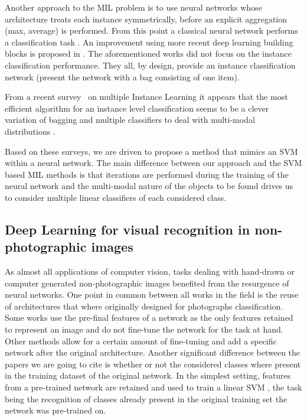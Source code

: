 \documentclass[preprint]{elsarticle}
\begin{document}
 Another approach to the MIL problem is to use neural networks whose architecture treats each instance symmetrically, before an explicit aggregation (max, average) is performed. From this point a classical neural network performs a classification task  \citep{ramon_multi_2000,zhou_neural_2002}. An improvement  using more recent deep learning building blocks is proposed in \citep{wang_revisiting_2018}.  The aforementioned works did not focus on the instance classification performance. They all, by design, provide an instance classification network (present the network with a bag consisting of one item). 


From a recent survey~\citep{carbonneau_multiple_2016} on multiple Instance Learning it appears that the most efficient algorithm for an instance level classification seems to be a clever variation of bagging and multiple classifiers to deal with multi-modal distributions \citep{carbonneau_robust_2016}.



 Based on these surveys, we are driven to propose a method that mimics an SVM within a neural network. The main difference between our approach and the SVM based MIL methods is that iterations are performed during the training of the neural network and the multi-modal nature of the objects to be found drives us to consider multiple linear classifiers of each considered class.


 














\subsection{Deep Learning for visual recognition in non-photographic images}

As almost all applications of computer vision, tasks dealing with hand-drawn or computer generated non-photographic images benefited from the resurgence of neural networks. One point in common between all works in the field is the reuse of architectures that where originally designed for photographs classification. Some works use the pre-final features of a network as the only features retained to represent an image and do not fine-tune the network for the task at hand. Other methods allow for a certain amount of fine-tuning and add a specific network after the original architecture.  Another significant difference between the papers we are going to cite is whether or not the considered classes where present in the training dataset of the original network. 
In the simplest setting, features from a pre-trained network are retained and used to train a linear SVM  \citep{crowley_search_2014,crowley_visual_2016}, the task being the recognition of classes already present in the original training set the network was pre-trained on. 
\end{document}
